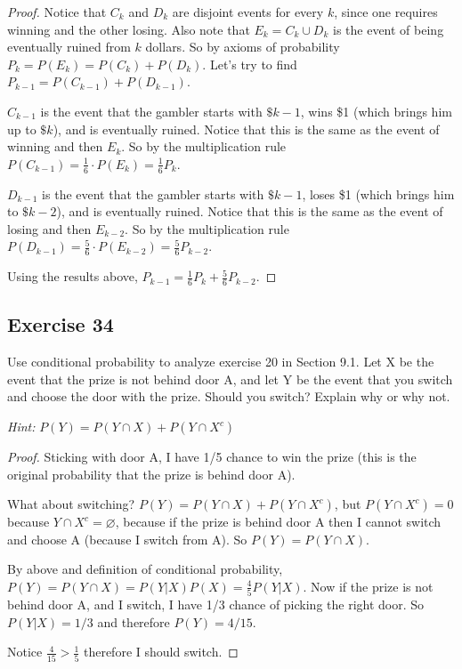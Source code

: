 \documentclass[14pt]{extarticle}
\newcommand{\es}{\varnothing}
\begin{document}
\begin{proof}
Notice that \(C_k\) and \(D_k\) are disjoint events for every \(k\), since one requires winning and the other losing. Also 
note that \(E_k = C_k \cup D_k\) is the event of being eventually ruined from \(k\) dollars. So by axioms of 
probability \(P_k = P(E_k) = P(C_k) + P(D_k)\). Let's try to find \(P_{k-1} = P(C_{k-1}) + P(D_{k-1})\). 

\(C_{k-1}\) is the event that the gambler starts with \(\$k-1\), wins \$1 (which brings him up to \(\$k\)), and is 
eventually ruined. Notice that this is the same as the event of winning and then \(E_k\). So by the multiplication rule 
\(P(C_{k-1}) = \frac{1}{6} \cdot P(E_k) = \frac{1}{6}P_k\).

\(D_{k-1}\) is the event that the gambler starts with \(\$k-1\), loses \$1 (which brings him to \(\$k-2\)), and is 
eventually ruined. Notice that this is the same as the event of losing and then \(E_{k-2}\). So by the multiplication rule 
\(P(D_{k-1}) = \frac{5}{6} \cdot P(E_{k-2}) = \frac{5}{6}P_{k-2}\).

Using the results above, \(P_{k-1} = \frac{1}{6}P_k + \frac{5}{6}P_{k-2}\).
\end{proof}

\subsection{Exercise 34}
Use conditional probability to analyze exercise 20 in Section 9.1. Let X be the event that the prize is not behind door A, 
and let Y be the event that you switch and choose the door with the prize. Should you switch? Explain why or why not.

{\it Hint:} \(P(Y) = P(Y \cap X) + P(Y \cap X^c)\)

\begin{proof}
Sticking with door A, I have 1/5 chance to win the prize (this is the original probability that the prize is behind door A).

What about switching? \(P(Y) = P(Y \cap X) + P(Y \cap X^c)\), but \(P(Y \cap X^c) = 0\) because \(Y \cap X^c = \es\), 
because if the prize is behind door A then I cannot switch and choose A (because I switch from A). So \(P(Y) = P(Y \cap X)\).

By above and definition of conditional probability, \(P(Y) = P(Y \cap X) = P(Y|X)P(X) = \frac{4}{5}P(Y|X)\). Now if the 
prize is not behind door A, and I switch, I have 1/3 chance of picking the right door. So \(P(Y|X) = 1/3\) and therefore 
\(P(Y) = 4/15\).

Notice \(\frac{4}{15} > \frac{1}{5}\) therefore I should switch.
\end{proof}
\end{document}
